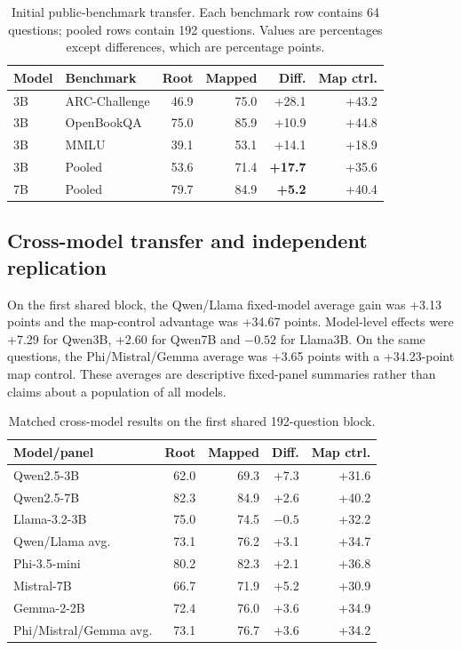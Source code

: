 \documentclass{article}
\begin{document}
\begin{table}[t]
\centering\small
\caption{Initial public-benchmark transfer. Each benchmark row contains 64 questions; pooled rows contain 192 questions. Values are percentages except differences, which are percentage points.}
\label{tab:public}
\begin{tabular}{@{}llrrrr@{}}
\toprule
Model & Benchmark & Root & Mapped & Diff. & Map ctrl.\\
\midrule
3B & ARC-Challenge & 46.9 & 75.0 & +28.1 & +43.2\\
3B & OpenBookQA & 75.0 & 85.9 & +10.9 & +44.8\\
3B & MMLU & 39.1 & 53.1 & +14.1 & +18.9\\
3B & Pooled & 53.6 & 71.4 & \textbf{+17.7} & +35.6\\
\midrule
7B & Pooled & 79.7 & 84.9 & \textbf{+5.2} & +40.4\\
\bottomrule
\end{tabular}
\end{table}

\subsection{Cross-model transfer and independent replication}
On the first shared block, the Qwen/Llama fixed-model average gain was +3.13 points and the map-control advantage was +34.67 points. Model-level effects were +7.29 for Qwen3B, +2.60 for Qwen7B and $-0.52$ for Llama3B. On the same questions, the Phi/Mistral/Gemma average was +3.65 points with a +34.23-point map control. These averages are descriptive fixed-panel summaries rather than claims about a population of all models.

\begin{table}[t]
\centering\small\setlength{\tabcolsep}{2.5pt}
\caption{Matched cross-model results on the first shared 192-question block.}
\label{tab:families}
\begin{tabular}{@{}lrrrr@{}}
\toprule
Model/panel & Root & Mapped & Diff. & Map ctrl.\\
\midrule
Qwen2.5-3B & 62.0 & 69.3 & +7.3 & +31.6\\
Qwen2.5-7B & 82.3 & 84.9 & +2.6 & +40.2\\
Llama-3.2-3B & 75.0 & 74.5 & $-0.5$ & +32.2\\
Qwen/Llama avg. & 73.1 & 76.2 & +3.1 & +34.7\\
\midrule
Phi-3.5-mini & 80.2 & 82.3 & +2.1 & +36.8\\
Mistral-7B & 66.7 & 71.9 & +5.2 & +30.9\\
Gemma-2-2B & 72.4 & 76.0 & +3.6 & +34.9\\
Phi/Mistral/Gemma avg. & 73.1 & 76.7 & +3.6 & +34.2\\
\bottomrule
\end{tabular}
\end{table}
\end{document}
